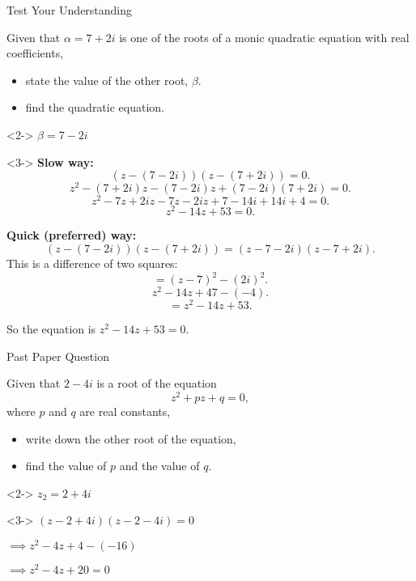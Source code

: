 \documentclass[8pt]{beamer}
\begin{document}
\begin{frame}{Test Your Understanding}
	\begin{problem}
		Given that $\alpha=7+2i$ is one of the roots of a monic quadratic equation with real coefficients,
		 \begin{itemize}
			\item state the value of the other root, $\beta$.
			\item find the quadratic equation.
		\end{itemize}
	\end{problem}

	\begin{solution}<2->
		$\beta=7-2i$
	\end{solution}

	\begin{solution}<3->
		\textbf{Slow way:} 
		\[
			(z-(7-2i))(z-(7+2i))=0
		.\] 
		\[
			z^2-(7+2i)z-(7-2i)z+(7-2i)(7+2i)=0
		.\] 
		\[
		z^2-7z+2iz-7z-2iz+7-14i+14i+4=0
		.\] 
		 \[
		z^2-14z+53=0
		.\] 

		\textbf{Quick (preferred) way:}
		\[
			(z-(7-2i))(z-(7+2i))=(z-7-2i)(z-7+2i)
		.\] 
		This is a difference of two squares:
		\[
			=(z-7)^2-(2i)^2
		.\] 
		\[
			z^2-14z+47-(-4)
		.\] 
		\[
		=z^2-14z+53
		.\] 

		So the equation is $z^2-14z+53=0$.
	\end{solution}
\end{frame}

\begin{frame}{Past Paper Question}
	\begin{problem}
		Given that $2-4i$ is a root of the equation
		 \[
		z^2+pz+q=0
		,\]
		where $p$ and $q$ are real constants,
		\begin{itemize}
			\item write down the other root of the equation,
			\item find the value of $p$ and the value of $q$.
		\end{itemize}
	\end{problem}
	
	\begin{solution}<2->
		$z_2=2+4i$
	\end{solution}
	\begin{solution}<3->
		$(z-2+4i)(z-2-4i)=0$

		$\implies z^2-4z+4-(-16)$

		$\implies z^2-4z+20=0$
	\end{solution}
\end{frame}
\end{document}
